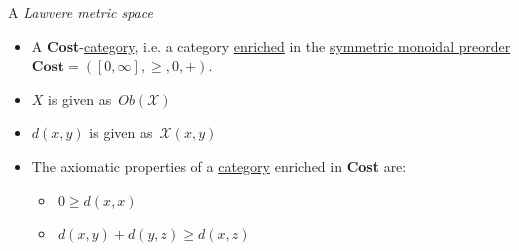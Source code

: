 A \emph{Lawvere metric space}

\begin{itemize}
    \item  A \textbf{Cost}-\hyperref[D2.46]{category}, i.e. a category \hyperref[D2.46]{enriched} in the \hyperref[D2.2]{symmetric monoidal preorder} $\mathbf{Cost}=([0,\infty],\geq,0,+)$.
    \item $X$ is given as \,$Ob(\mathcal{X})$\,
    \item $d(x,y)$ is given as \,$\mathcal{X}(x,y)$\,
    \item The axiomatic properties of a \hyperref[D2.46]{category} enriched in \textbf{Cost} are:
          \begin{itemize}
            \item \,$0 \geq d(x,x)$\,
            \item \,$d(x,y)+d(y,z) \geq d(x,z)$\,
          \end{itemize}
  \end{itemize}

